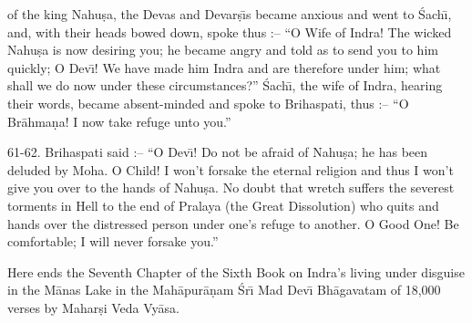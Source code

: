 of the king Nahu\d{s}a, the Devas and Devar\d{s}\={\i}s became anxious and went to \'Sach\={\i}, and, with their heads bowed down, spoke thus :-- ``O Wife of Indra! The wicked Nahu\d{s}a is now desiring you; he became angry and told as to send you to him quickly; O Dev\={\i}! We have made him Indra and are therefore under him; what shall we do now under these circumstances?'' \'Sach\={\i}, the wife of Indra, hearing their words, became absent-minded and spoke to Brihaspati, thus :-- ``O Br\=ahma\d{n}a! I now take refuge unto you.''

61-62. Brihaspati said :-- ``O Dev\={\i}! Do not be afraid of Nahu\d{s}a; he has been deluded by Moha. O Child! I won't forsake the eternal religion and thus I won't give you over to the hands of Nahu\d{s}a. No doubt that wretch suffers the severest torments in Hell to the end of Pralaya (the Great Dissolution) who quits and hands over the distressed person under one's refuge to another. O Good One! Be comfortable; I will never forsake you.''

Here ends the Seventh Chapter of the Sixth Book on Indra's living under disguise in the M\=anas Lake in the Mah\=apur\=a\d{n}am \'Sr\={\i} Mad Dev\={\i} Bh\=agavatam of 18,000 verses by Mahar\d{s}i Veda Vy\=asa.



